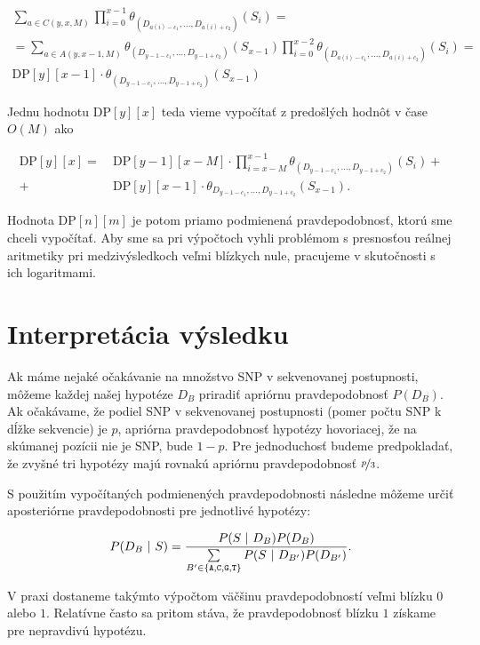 \begin{align*}
\sum\limits_{a \in C(y, x, M)} \prod\limits_{i=0}^{x-1} \theta_{(D_{a(i)-c_1}, \dots, D_{a(i)+c_2})}(S_i) = \\
= \sum\limits_{a \in A(y, x-1, M)} \theta_{(D_{y-1-c_1}, \dots, D_{y-1+c_2})}(S_{x-1}) \prod\limits_{i=0}^{x-2} \theta_{(D_{a(i)-c_1}, \dots, D_{a(i)+c_2})}(S_i)  = \\
\mathrm{DP}[y][x-1] \cdot \theta_{(D_{y-1-c_1}, \dots, D_{y-1+c_2})}(S_{x-1})
\end{align*}

Jednu hodnotu $\mathrm{DP}[y][x]$ teda vieme vypočítať z predošlých hodnôt v čase $O(M)$ ako

\begin{align*}
\mathrm{DP}[y][x] =~ &\mathrm{DP}[y-1][x-M] \cdot \prod\limits_{i=x-M}^{x-1} \theta_{(D_{y-1-c_1}, \dots, D_{y-1+c_2})} (S_i) + \\
+~ &\mathrm{DP}[y][x-1] \cdot \theta_{D_{y-1-c_1}, \dots, D_{y-1+c_2}}(S_{x-1}) \text{.}
\end{align*}

Hodnota $\mathrm{DP}[n][m]$ je potom priamo podmienená pravdepodobnosť, ktorú sme chceli vypočítať. Aby sme sa pri výpočtoch vyhli
problémom s presnosťou reálnej aritmetiky pri medzivýsledkoch veľmi blízkych nule, pracujeme v skutočnosti s ich
logaritmami.


\section{Interpretácia výsledku}

Ak máme nejaké očakávanie na množstvo SNP v sekvenovanej postupnosti, môžeme
každej našej hypotéze $D_B$ priradiť apriórnu pravdepodobnosť $P(D_B)$.
Ak očakávame, že podiel SNP v sekvenovanej postupnosti (pomer počtu SNP k dĺžke sekvencie) je $p$, 
apriórna pravdepodobnosť hypotézy hovoriacej, že na skúmanej pozícii nie je SNP, bude $1-p$.  Pre 
jednoduchosť budeme predpokladať, že zvyšné tri hypotézy majú rovnakú apriórnu pravdepodobnosť 
$\nicefrac{p}{3}$.

 S použitím vypočítaných 
podmienených 
pravdepodobnosti následne môžeme určiť aposteriórne pravdepodobnosti pre jednotlivé hypotézy:

$$P(D_B ~|~ S) = \frac{P(S ~|~ D_B) P(D_B)}{\sum\limits_{B' \in \{\texttt{A}, \texttt{C}, \texttt{G}, \texttt{T}\}}  P(S ~|~ D_{B'}) P(D_{B'})} 
\text{.}$$

V praxi dostaneme takýmto výpočtom väčšinu pravdepodobností veľmi blízku $0$ alebo $1$. Relatívne často
sa pritom stáva, že pravdepodobnosť blízku $1$ získame pre nepravdivú hypotézu.

